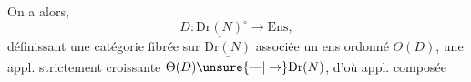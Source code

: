 On a alors,  
\[ D\colon \underline{\mathrm{Dr}(N)}^{\circ}\longrightarrow\mathrm{Ens}, \]
définissant une catégorie fibrée sur $\underline{\mathrm{Dr}(N)}$ associée  un ens ordonné $\Theta(D)$, une appl. strictement croissante $\Theta(D)\unsure{\text{---}|\to}\mathrm{Dr}(N)$, d'où appl. composée
